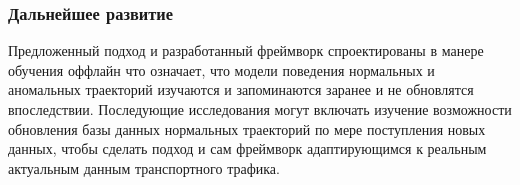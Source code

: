 \bigbreak

\subsubsection{Дальнейшее развитие}

Предложенный подход и разработанный фреймворк спроектированы в манере обучения оффлайн что означает, что модели поведения нормальных и аномальных траекторий изучаются и запоминаются заранее и не обновлятся впоследствии. Последующие исследования могут включать изучение возможности обновления базы данных нормальных траекторий по мере поступления новых данных, чтобы сделать подход и сам фреймворк адаптирующимся к реальным актуальным данным транспортного трафика.
